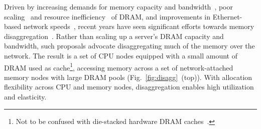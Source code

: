 \noindent
Driven by increasing demands for memory capacity and bandwidth~\cite{scuba, cachelib, tao, memcache, flighttracker, twittercache, spark}, poor scaling~\cite{memscaling2, memscaling3, memscaling1} and resource inefficiency~\cite{infiniswap, memoverprovisioning} of DRAM, and improvements in Ethernet-based network speeds~\cite{terabitethernet, remotememory}, recent years have seen significant efforts towards memory disaggregation~\cite{fastswap, memdisagg1, infiniswap, mind, legoos}. Rather than scaling up a server's DRAM capacity and bandwidth, such proposals advocate disaggregating much of the memory over the network. The result is a set of CPU nodes equipped with a small amount of DRAM used as cache\footnote{Not to be confused with die-stacked hardware DRAM caches~\cite{jevdjic2013stacked, jevdjic2014unison, young2018accord}.}, accessing memory across a set of network-attached memory nodes with large DRAM pools (Fig.~\ref{fig:disagg}~(top)). With allocation flexibility across CPU and memory nodes, disaggregation enables high utilization and elasticity.

